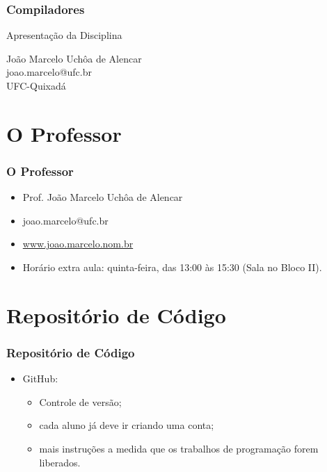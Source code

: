 \documentclass[table]{beamer}
\begin{document}
\begin{frame}
   \frametitle{Compiladores}
   \large
   \begin{center}
      Apresentação da Disciplina 
   \end{center}
   \scriptsize
   \begin{center}
      João Marcelo Uchôa de Alencar \\
      joao.marcelo@ufc.br \\
      UFC-Quixadá
   \end{center}
\end{frame}

\begin{frame}
   \tableofcontents
\end{frame}

\section{O Professor}
\begin{frame}
   \frametitle{O Professor}
   \begin{itemize}
      \item Prof. João Marcelo Uchôa de Alencar
      \item joao.marcelo@ufc.br
      \item \url{www.joao.marcelo.nom.br}
      \item Horário extra aula: quinta-feira, das 13:00 às 15:30 (Sala no Bloco II).
   \end{itemize}
\end{frame}

\section{Repositório de Código}
\begin{frame}
   \frametitle{Repositório de Código}
   \begin{itemize}
      \item GitHub:
      \begin{itemize}
         \item Controle de versão;
	      \item cada aluno já deve ir criando uma conta;
	      \item mais instruções a medida que os trabalhos de programação forem liberados.
      \end{itemize}
   \end{itemize}
\end{frame}
\end{document}
